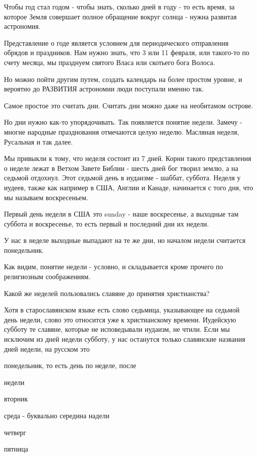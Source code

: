 \documentclass[a5paper,11pt,openany]{article}
\begin{document}
   Чтобы год стал годом - чтобы знать, сколько дней в году - то есть время, за которое Земля совершает полное обращение вокруг солнца - нужна развитая астрономия. 

   Представление о годе является условием для периодического отправления обрядов и праздников. Нам нужно знать, что 3 или 11 февраля, или такого-то по счету месяца, мы празднуем святого Власа или скотьего бога Волоса.

   Но можно пойти другим путем, создать календарь на более простом уровне, и вероятно до РАЗВИТИЯ астрономии люди поступали именно так.

   Самое простое это считать дни. Считать дни можно даже на необитамом острове.

   Но дни нужно как-то упорядочивать. Так появляется понятие недели. Замечу - многие народные празднования отмечаются целую неделю. Масляная неделя, Русальная и так далее.

   Мы привыкли к тому, что неделя состоит из 7 дней. Корни такого представления о неделе лежат в Ветхом Завете Библии - шесть дней бог творил землю, а на седьмой отдохнул. Этот седьмой день в иудаизме - шаббат, суббота. Неделя у иудеев, также как например в США, Англии и Канаде, начинается с того дня, что мы называем воскресеньем. 

   Первый день недели в США это sunday - наше воскресенье, а выходные там суббота и воскресенье, то есть первый и последний дни их недели.

   У нас в неделе выходные выпадают на те же дни, но началом недели считается понедельник.

   Как видим, понятие недели - условно, и складывается кроме прочего по религиозным соображениям.

  Какой же неделей пользовались славяне до принятия христианства?

   Хотя в старославянском языке есть слово седьмица, указывающее на седьмой день недели, слово это относится уже к христианскому времени. Иудейскую субботу те славяне, которые не исповедывали иудаизм, не чтили. Если мы исключим из дней недели субботу, у нас останутся только славянские названия дней недели, на русском это


понедельник, то есть день по неделе, после 

недели

вторник

среда - буквально середина надели

четверг

пятница
\end{document}
